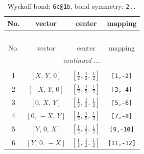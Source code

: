 \documentclass[fleqn,8pt]{jsarticle}
\begin{document}
\renewcommand{\arraystretch}{1.2}
\begin{longtable}{cccc}
\caption{Wyckoff bond: {\tt 6c@1b}, bond symmetry: {\tt 2..}}
 \\
 \hline \hline
No. & vector & center & mapping \\ \hline \endfirsthead

\multicolumn{3}{l}{\tablename\ \thetable{}} \\
 \hline \hline
No. & vector & center & mapping \\ \hline \endhead

 \hline \hline
\multicolumn{3}{r}{\footnotesize\it continued ...} \\ \endfoot

 \hline \hline
\multicolumn{3}{r}{} \\ \endlastfoot

1 & $\left[ X,\, Y,\, 0 \right]$ & $\left[ \frac{1}{2},\, \frac{1}{2},\, \frac{1}{2} \right]$ & {\tt [1,-2]} \\ \hline
2 & $\left[ - X,\, Y,\, 0 \right]$ & $\left[ \frac{1}{2},\, \frac{1}{2},\, \frac{1}{2} \right]$ & {\tt [3,-4]} \\ \hline
3 & $\left[ 0,\, X,\, Y \right]$ & $\left[ \frac{1}{2},\, \frac{1}{2},\, \frac{1}{2} \right]$ & {\tt [5,-6]} \\ \hline
4 & $\left[ 0,\, - X,\, Y \right]$ & $\left[ \frac{1}{2},\, \frac{1}{2},\, \frac{1}{2} \right]$ & {\tt [7,-8]} \\ \hline
5 & $\left[ Y,\, 0,\, X \right]$ & $\left[ \frac{1}{2},\, \frac{1}{2},\, \frac{1}{2} \right]$ & {\tt [9,-10]} \\ \hline
6 & $\left[ Y,\, 0,\, - X \right]$ & $\left[ \frac{1}{2},\, \frac{1}{2},\, \frac{1}{2} \right]$ & {\tt [11,-12]} \\
\end{longtable}
\renewcommand{\arraystretch}{1.2}
\end{document}
